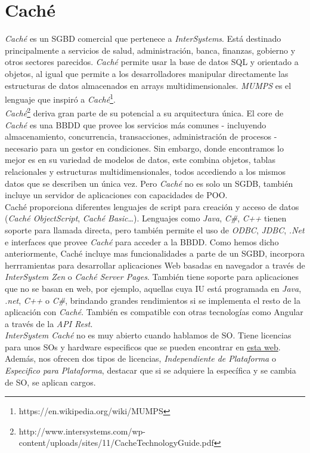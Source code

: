 \documentclass{article}
\begin{document}
\section{Caché}
\emph{Caché} es un SGBD comercial que pertenece a \emph{InterSystems}. Está destinado principalmente a servicios de salud, administración, banca, finanzas, gobierno y otros sectores parecidos. \emph{Caché} permite usar la base de datos SQL y orientado a objetos, al igual que permite a los desarrolladores manipular directamente las estructuras de datos almacenados en arrays multidimensionales. \emph{MUMPS} es el lenguaje que inspiró a \emph{Caché}\footnote{https://en.wikipedia.org/wiki/MUMPS}.\cite{wikiCache}\\

\emph{Caché}\footnote{http://www.intersystems.com/wp-content/uploads/sites/11/CacheTechnologyGuide.pdf} deriva gran parte de su potencial a su arquitectura única. El core de \emph{Caché} es una BBDD que provee los servicios más comunes - incluyendo almacenamiento, concurrencia, transacciones, administración de procesos - necesario para un gestor en condiciones. Sin embargo, donde encontramos lo mejor es en su variedad de modelos de datos, este combina objetos, tablas relacionales y estructuras multidimensionales, todos accediendo a los mismos datos que se describen un única vez. Pero \emph{Caché} no es solo un SGDB, también incluye un servidor de aplicaciones con capacidades de POO.  \\
Caché proporciona diferentes lenguajes de script para creación y acceso de datos (\emph{Caché ObjectScript}, \emph{Caché Basic}…). Lenguajes como \emph{Java},\emph{ C\#}, \emph{C++} tienen soporte para llamada directa, pero también permite el uso de \emph{ODBC}, \emph{JDBC}, \emph{.Net} e interfaces que provee \emph{Caché} para acceder a la BBDD. Como hemos dicho anteriormente, Caché incluye mas funcionalidades a parte de un SGBD, incorpora herrramientas para desarrollar aplicaciones Web basadas en navegador a través de\emph{ InterSystem Zen} o \emph{Caché Server Pages}. También tiene soporte para aplicaciones que no se basan en web, por ejemplo, aquellas cuya IU está programada en \emph{Java}, \emph{.net},\emph{ C++} o\emph{ C\#}, brindando grandes rendimientos si se implementa el resto de la aplicación con \emph{Caché}. También es compatible con otras tecnologías como Angular a través de la \emph{API Rest}.\\

\emph{InterSystem Caché }no es muy abierto cuando hablamos de SO. Tiene licencias para unos SOs y hardware especificos que se pueden encontrar en \href{https://www.intersystems.com/support-learning/support/cache-licensing-platforms/}{esta web}. Además, nos ofrecen dos tipos de licencias, \emph{Independiente de Plataforma} o \emph{Especifico para Plataforma}, destacar que si se adquiere la específica y se cambia de SO, se aplican cargos. \\
\end{document}
